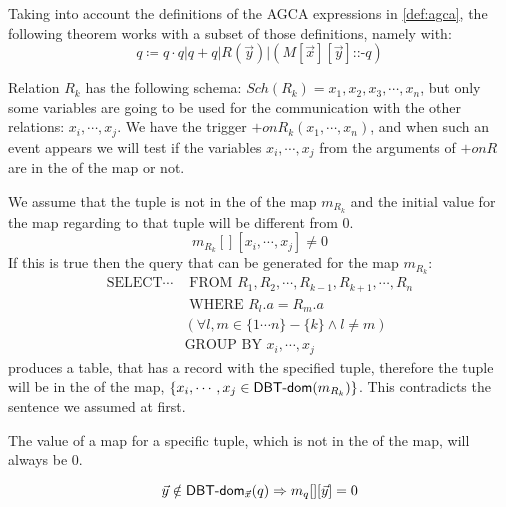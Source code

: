 \documentclass[12pt]{article}
\begin{document}
Taking into account the definitions of the AGCA expressions in \eqref{def:agca}, the following theorem works with a subset of those definitions, namely with:
$$q\coloneqq q\cdot q | q + q|R(\vec{y})|(M[\vec{x}][\vec{y}]\text{::-}q)$$
	
Relation $R_k$ has the following schema: $Sch(R_k)={x_1,x_2,x_3,\cdots,x_n}$, but only some variables are going to be used for the communication with the other relations: $x_i,\cdots,x_j$. We have the trigger $+onR_k(x_1,\cdots,x_n)$, and when such an event appears we will test if the variables $x_i,\cdots,x_j$ from the arguments of $+onR$ are in the \dom{} of the map or not. 
	
We assume that the tuple is not in the \dom{} of the map $m_{R_k}$ and the initial value for the map regarding to that tuple will be different from 0.
$$m_{R_k}[][x_i,\cdots,x_j]\not= 0$$
If this is true then the query that can be generated for the map $m_{R_k}$:
\begin{align*}
\mbox{SELECT}\cdots&\mbox{ FROM }R_1,R_2,\cdots,R_{k-1},R_{k+1},\cdots,R_n\\
&\mbox{ WHERE }R_l.a=R_m.a\\
&(\forall l,m\in\{1\cdots n\}-\{k\}\land l\not=m)\\
&\mbox{GROUP BY } x_i,\cdots,x_j
\end{align*}
 produces a table, that has a record with the specified tuple, therefore the tuple will be in the \dom{} of the map, $\{x_i,\cdots,x_j\in \textsf{DBT-dom}(m_{R_k}) \}$. This contradicts the sentence we assumed at first. 

\begin{theorem}
\label{thm:1}
The value of a map for a specific tuple, which is not in the \dom{} of the map, will always be 0.
\end{theorem}
$$\vec{y}\notin\textsf{DBT-dom}{}_{\vec{x}}(q)\Rightarrow m_q[][\vec{y}]=0$$
\end{document}
